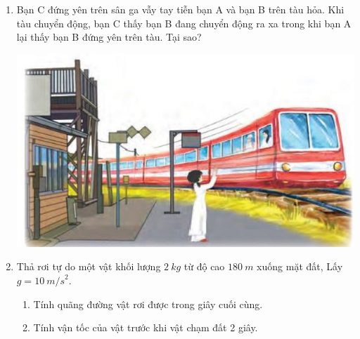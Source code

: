 \begin{enumerate}[label=\bfseries Câu \arabic*:]
		\item {}
	
	{
		Bạn C đứng yên trên sân ga vẫy tay tiễn bạn A và bạn B trên tàu hỏa. Khi tàu chuyển động, bạn C thấy bạn B đang chuyển động ra xa trong khi bạn A lại thấy bạn B đứng yên trên tàu. Tại sao?
		\begin{center}
			\includegraphics[scale=0.6]{../figs/VN10-2022-PH-TP0001-5.jpg}
		\end{center}	
		
	}
	
	\item {}
	
	{
	Thả rơi tự do một vật khối lượng $\SI{2}{kg}$ từ độ cao $\SI{180}{m}$ xuống mặt đất, Lấy $g = \SI{10}{m/s}^2$.
		\begin{enumerate}
			\item Tính quãng đường vật rơi được trong giây cuối cùng.
			\item Tính vận tốc của vật trước khi vật chạm đất 2 giây.
		\end{enumerate}
	}
	
\end{enumerate}
